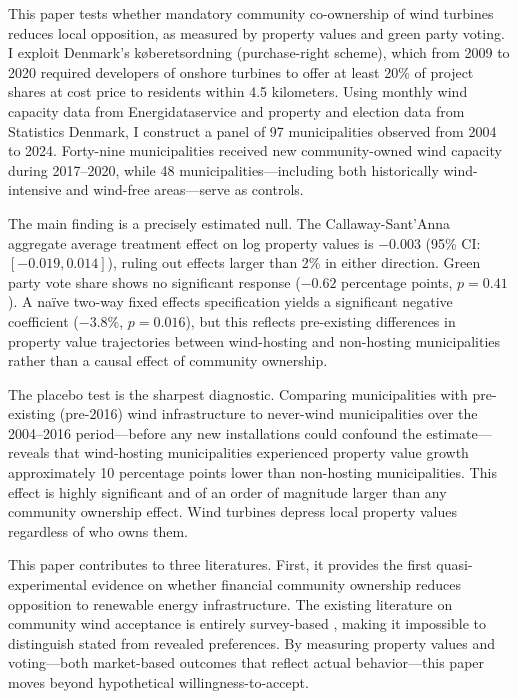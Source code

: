 \documentclass[12pt]{article}
\begin{document}
This paper tests whether mandatory community co-ownership of wind turbines reduces local opposition, as measured by property values and green party voting. I exploit Denmark's k{\o}beretsordning (purchase-right scheme), which from 2009 to 2020 required developers of onshore turbines to offer at least 20\% of project shares at cost price to residents within 4.5 kilometers. Using monthly wind capacity data from Energidataservice and property and election data from Statistics Denmark, I construct a panel of 97 municipalities observed from 2004 to 2024. Forty-nine municipalities received new community-owned wind capacity during 2017--2020, while 48 municipalities---including both historically wind-intensive and wind-free areas---serve as controls.

The main finding is a precisely estimated null. The Callaway-Sant'Anna aggregate average treatment effect on log property values is $-0.003$ (95\% CI: $[-0.019, 0.014]$), ruling out effects larger than 2\% in either direction. Green party vote share shows no significant response ($-0.62$ percentage points, $p = 0.41$). A na\"ive two-way fixed effects specification yields a significant negative coefficient ($-3.8\%$, $p = 0.016$), but this reflects pre-existing differences in property value trajectories between wind-hosting and non-hosting municipalities rather than a causal effect of community ownership.

The placebo test is the sharpest diagnostic. Comparing municipalities with pre-existing (pre-2016) wind infrastructure to never-wind municipalities over the 2004--2016 period---before any new installations could confound the estimate---reveals that wind-hosting municipalities experienced property value growth approximately 10 percentage points lower than non-hosting municipalities. This effect is highly significant and of an order of magnitude larger than any community ownership effect. Wind turbines depress local property values regardless of who owns them.

This paper contributes to three literatures. First, it provides the first quasi-experimental evidence on whether financial community ownership reduces opposition to renewable energy infrastructure. The existing literature on community wind acceptance is entirely survey-based \citep{Jorgensen2020, Suskevics2019, Liebe2017, WustenagenMenichetti2012}, making it impossible to distinguish stated from revealed preferences. By measuring property values and voting---both market-based outcomes that reflect actual behavior---this paper moves beyond hypothetical willingness-to-accept.
\end{document}
